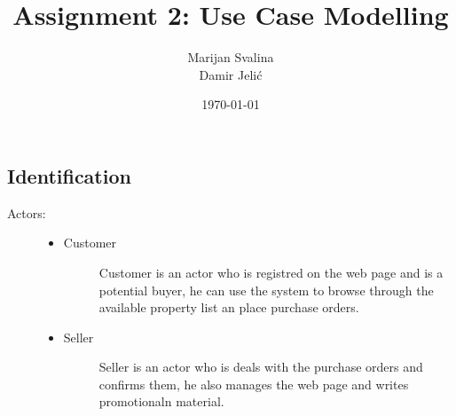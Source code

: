 \documentclass[12pt, titlepage, a4paper]{article}
\title{Assignment 2: Use Case Modelling}
\date{\today}
\author{Marijan Svalina \\ Damir Jelić}
\begin{document}
\maketitle 

\setcounter{section}{2}
\subsection{Identification}

\begin{description}
    \item[Actors:] \hfil
    \begin{itemize}
    \item
        Customer
        \begin{description}
            \item[]Customer is an actor who is registred on the web page and is a potential buyer, 
            he can use the system to browse through the available 
            property list an place purchase orders. 
        \end{description}
    \item
        Seller
        \begin{description}
            \item[]Seller is an actor who is deals with the purchase orders and confirms them,
		    he also manages the web page and writes promotionaln material.
        \end{description}
    \end{itemize}


\end{description}
\end{document}
